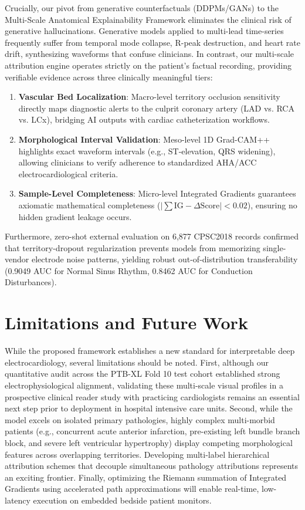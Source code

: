 \documentclass[5p,twocolumn,10pt]{elsarticle}
\begin{document}
Crucially, our pivot from generative counterfactuals (DDPMs/GANs) to the Multi-Scale Anatomical Explainability Framework eliminates the clinical risk of generative hallucinations. Generative models applied to multi-lead time-series frequently suffer from temporal mode collapse, R-peak destruction, and heart rate drift, synthesizing waveforms that confuse clinicians. In contrast, our multi-scale attribution engine operates strictly on the patient's factual recording, providing verifiable evidence across three clinically meaningful tiers:
\begin{enumerate}
    \item \textbf{Vascular Bed Localization}: Macro-level territory occlusion sensitivity directly maps diagnostic alerts to the culprit coronary artery (LAD vs. RCA vs. LCx), bridging AI outputs with cardiac catheterization workflows.
    \item \textbf{Morphological Interval Validation}: Meso-level 1D Grad-CAM++ highlights exact waveform intervals (e.g., ST-elevation, QRS widening), allowing clinicians to verify adherence to standardized AHA/ACC electrocardiological criteria.
    \item \textbf{Sample-Level Completeness}: Micro-level Integrated Gradients guarantees axiomatic mathematical completeness ($|\sum \text{IG} - \Delta \text{Score}| < 0.02$), ensuring no hidden gradient leakage occurs.
\end{enumerate}

Furthermore, zero-shot external evaluation on 6,877 CPSC2018 records confirmed that territory-dropout regularization prevents models from memorizing single-vendor electrode noise patterns, yielding robust out-of-distribution transferability (0.9049 AUC for Normal Sinus Rhythm, 0.8462 AUC for Conduction Disturbances).

\section{Limitations and Future Work}
\label{sec:limitations}
While the proposed framework establishes a new standard for interpretable deep electrocardiology, several limitations should be noted. First, although our quantitative audit across the PTB-XL Fold 10 test cohort established strong electrophysiological alignment, validating these multi-scale visual profiles in a prospective clinical reader study with practicing cardiologists remains an essential next step prior to deployment in hospital intensive care units. Second, while the model excels on isolated primary pathologies, highly complex multi-morbid patients (e.g., concurrent acute anterior infarction, pre-existing left bundle branch block, and severe left ventricular hypertrophy) display competing morphological features across overlapping territories. Developing multi-label hierarchical attribution schemes that decouple simultaneous pathology attributions represents an exciting frontier. Finally, optimizing the Riemann summation of Integrated Gradients using accelerated path approximations will enable real-time, low-latency execution on embedded bedside patient monitors.
\end{document}
